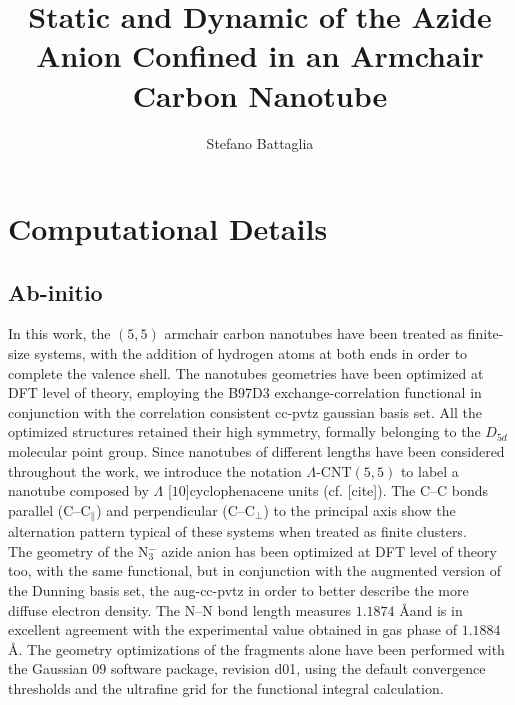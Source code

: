 \documentclass[utf8]{article}
\title{\LARGE Static and Dynamic of the Azide Anion Confined in an Armchair Carbon Nanotube}
\author{Stefano Battaglia}
\begin{document}
\maketitle

\section{Computational Details}

\subsection{Ab-initio}
In this work, the $(5,5)$ armchair carbon nanotubes have been treated as finite-size systems, with the addition of hydrogen atoms at both ends in order to complete the valence shell.
The nanotubes geometries have been optimized at DFT level of theory, employing the B97D3 exchange-correlation functional\cite{Grimme2010} in conjunction with the correlation consistent cc-pvtz gaussian basis set\cite{DunningJr1989}.
All the optimized structures retained their high symmetry, formally belonging to the $D_{5d}$ molecular point group.
Since nanotubes of different lengths have been considered throughout the work, we introduce the notation $\Lambda$-CNT$(5,5)$ to label a nanotube composed by $\Lambda$ [$10$]cyclophenacene units (cf. [cite]).
The C--C bonds parallel (C--C$_{\parallel}$) and perpendicular (C--C$_{\perp}$) to the principal axis show the alternation pattern typical of these systems when treated as finite clusters\cite{Zhou2004,Galano2006}.\\
The geometry of the N$_3^-$ azide anion has been optimized at DFT level of theory too, with the same functional, but in conjunction with the augmented version of the Dunning basis set, the aug-cc-pvtz in order to better describe the more diffuse electron density.
The N--N bond length measures $1.1874$ \AA and is in excellent agreement with the experimental value obtained in gas phase of $1.1884$ \AA\cite{Polak1987}.
The geometry optimizations of the fragments alone have been performed with the Gaussian 09 software package, revision d01\cite{g09}, using the default convergence thresholds and the ultrafine grid for the functional integral calculation.
\end{document}

